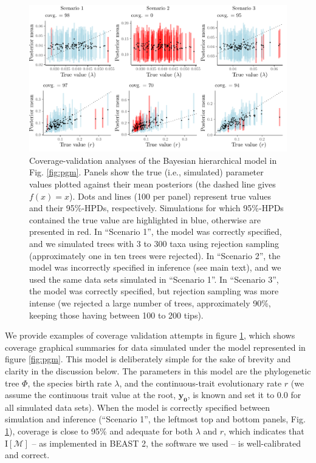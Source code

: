 \documentclass[oneside]{article}
\begin{document}
\begin{figure}
  \includegraphics[width=\textwidth]{../figures/graphical_model_coverage.pdf}
  \caption{
    Coverage-validation analyses of the Bayesian hierarchical model in Fig. \ref{fig:pgm}.
    Panels show the true (i.e., simulated) parameter values plotted against their mean posteriors (the dashed line gives $f(x) = x$).
    Dots and lines (100 per panel) represent true values and their 95\%-HPDs, respectively.
    Simulations for which 95\%-HPDs contained the true value are highlighted in blue, otherwise are presented in red.
    In ``Scenario 1'', the model was correctly specified, and we simulated trees with 3 to 300 taxa using rejection sampling (approximately one in ten trees were rejected).
    In ``Scenario 2'', the model was incorrectly specified in inference (see main text), and we used the same data sets simulated in ``Scenario 1''.
    In ``Scenario 3'', the model was correctly specified, but rejection sampling was more intense (we rejected a large number of trees, approximately 90\%, keeping those having between 100 to 200 tips).
  }
  \label{fig:yulecalval}
\end{figure}

We provide examples of coverage validation attempts in figure \ref{fig:yulecalval}, which shows coverage graphical summaries for data simulated under the model represented in figure \ref{fig:pgm}.
This model is deliberately simple for the sake of brevity and clarity in the discussion below.
The parameters in this model are the phylogenetic tree $\Phi$, the species birth rate $\lambda$, and the continuous-trait evolutionary rate $r$ (we assume the continuous trait value at the root, $\boldsymbol{y_0}$, is known and set it to $\boldsymbol{0.0}$ for all simulated data sets).
When the model is correctly specified between simulation and inference (``Scenario 1'', the leftmost top and bottom panels, Fig. \ref{fig:yulecalval}), coverage is close to 95\% and adequate for both $\lambda$ and $r$, which indicates that $\text{I}[\mathcal{M}]$ -- as implemented in BEAST 2, the software we used -- is well-calibrated and correct.
\end{document}
